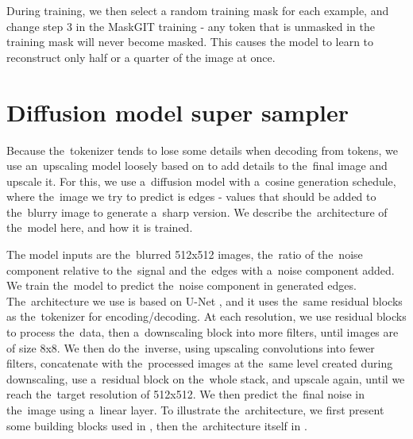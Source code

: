 
During training, we then select a random training mask for each example, and change step 3 in the MaskGIT training - any token that is unmasked in the training mask will never become masked. This causes the model to learn to reconstruct only half or a quarter of the image at once.





\section{Diffusion model super sampler}

Because the~tokenizer tends to lose some details when decoding from tokens, we use an~upscaling model loosely based on \citep{diffusion_super_sampler} to add details to the~final image and upscale it. For this, we use a~diffusion model with a~cosine generation schedule, where the~image we try to predict is edges - values that should be added to the~blurry image to generate a~sharp version. We describe the~architecture of the~model here, and how it is trained.

The model inputs are the~blurred 512x512 images, the~ratio of the~noise component relative to the~signal and the~edges with a~noise component added. We train the~model to predict the~noise component in generated edges. The~architecture we use is based on U-Net \citep{u_net}, and it uses the~same residual blocks as the~tokenizer for encoding/decoding. At each resolution, we use residual blocks to process the~data, then a~downscaling block into more filters, until images are of size 8x8. We then do the~inverse, using upscaling convolutions into fewer filters, concatenate with the~processed images at the~same level created during downscaling, use a~residual block on the~whole stack, and upscale again, until we reach the~target resolution of 512x512. We then predict the~final noise in the~image using a~linear layer. To illustrate the~architecture, we first present some building blocks used in , then the~architecture itself in .




